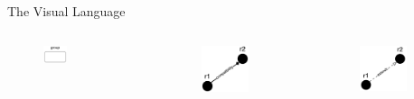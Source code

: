 \begin{frame}[allowframebreaks]{The Visual Language}
\begin{columns}
    \begin{column}{0.5\textwidth}
        \begin{figure}
            \centering
            \includegraphics[width=0.35\textwidth]{images/visual-language/group.png}
        \end{figure}
    \end{column}
    \begin{column}{0.25\textwidth}
        \begin{figure}
            \centering
            \includegraphics[width=0.7\textwidth]{images/visual-language/compatibility.png}
        \end{figure}
    \end{column}
    \begin{column}{0.25\textwidth}
        \begin{figure}
            \centering
            \includegraphics[width=0.7\textwidth]{images/visual-language/extension.png}

\end{figure}
\end{column}
\end{columns}
\end{frame}
